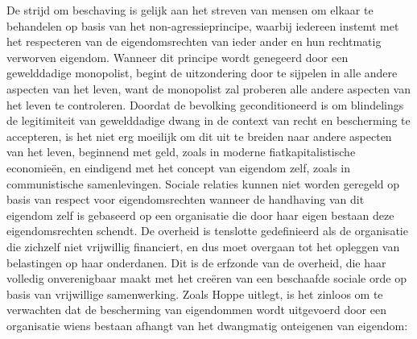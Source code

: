 De strijd om beschaving is gelijk aan het streven van mensen om elkaar te behandelen op basis van het non-agressieprincipe, waarbij iedereen instemt met het respecteren van de eigendomsrechten van ieder ander en hun rechtmatig verworven eigendom. Wanneer dit principe wordt genegeerd door een gewelddadige monopolist, begint de uitzondering door te sijpelen in alle andere aspecten van het leven, want de monopolist zal proberen alle andere aspecten van het leven te controleren. Doordat de bevolking geconditioneerd is om blindelings de legitimiteit van gewelddadige dwang in de context van recht en bescherming te accepteren, is het niet erg moeilijk om dit uit te breiden naar andere aspecten van het leven, beginnend met geld, zoals in moderne fiatkapitalistische economieën, en eindigend met het concept van eigendom zelf, zoals in communistische samenlevingen. Sociale relaties kunnen niet worden geregeld op basis van respect voor eigendomsrechten wanneer de handhaving van dit eigendom zelf is gebaseerd op een organisatie die door haar eigen bestaan deze eigendomsrechten schendt. De overheid is tenslotte gedefinieerd als de organisatie die zichzelf niet vrijwillig financiert, en dus moet overgaan tot het opleggen van belastingen op haar onderdanen. Dit is de erfzonde van de overheid, die haar volledig onverenigbaar maakt met het creëren van een beschaafde sociale orde op basis van vrijwillige samenwerking. Zoals Hoppe uitlegt, is het zinloos om te verwachten dat de bescherming van eigendommen wordt uitgevoerd door een organisatie wiens bestaan afhangt van het dwangmatig onteigenen van eigendom:


